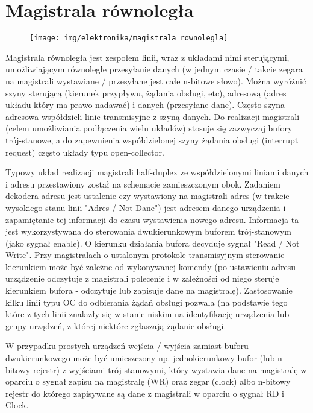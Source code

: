 \documentclass{pdfBooklets}
\begin{document}
\section{Magistrala równoległa}

\begin{figure}\begin{center}
    \texttt{[image: img/elektronika/magistrala\_rownolegla]}
\end{center}\end{figure}
Magistrala równoległa jest zespołem linii, wraz z układami nimi sterującymi, umożliwiającym równoległe przesyłanie danych (w jednym czasie / takcie zegara na magistrali wystawiane / przesyłane jest całe n-bitowe słowo).
Można wyróżnić szyny sterującą (kierunek przypływu, żądania obsługi, etc), adresową (adres układu który ma prawo nadawać) i danych (przesyłane dane). Często szyna adresowa współdzieli linie transmisyjne z szyną danych.
Do realizacji magistrali (celem umożliwiania podłączenia wielu układów) stosuje się zazwyczaj bufory trój-stanowe, a do zapewnienia współdzielonej szyny żądania obsługi (interrupt request) często układy typu open-collector.

Typowy układ realizacji magistrali half-duplex ze współdzielonymi liniami danych i adresu przestawiony został na schemacie zamieszczonym obok.
Zadaniem dekodera adresu jest ustalenie czy wystawiony na magistrali adres (w trakcie wysokiego stanu linii "Adres / Not Dane") jest adresem danego urządzenia i zapamiętanie tej informacji do czasu wystawienia nowego adresu. Informacja ta jest wykorzystywana do sterowania dwukierunkowym buforem trój-stanowym (jako sygnał enable).
O kierunku działania bufora decyduje sygnał "Read / Not Write". Przy magistralach o ustalonym protokole transmisyjnym sterowanie kierunkiem może być zależne od wykonywanej komendy (po ustawieniu adresu urządzenie odczytuje z magistrali polecenie i w zależności od niego steruje kierunkiem bufora - odczytuje lub zapisuje dane na magistralę).
Zastosowanie kilku linii typu OC do odbierania żądań obsługi pozwala (na podstawie tego które z tych linii znalazły się w stanie niskim na identyfikację urządzenia lub grupy urządzeń, z której niektóre zgłaszają żądanie obsługi.

W przypadku prostych urządzeń wejścia / wyjścia zamiast buforu dwukierunkowego może być umieszczony np.
jednokierunkowy bufor (lub n-bitowy rejestr) z wyjściami trój-stanowymi, który wystawia dane na magistralę w oparciu o sygnał zapisu na magistralę (WR) oraz zegar (clock) albo
n-bitowy rejestr do którego zapisywane są dane z magistrali w oparciu o sygnał RD i Clock.
\end{document}
